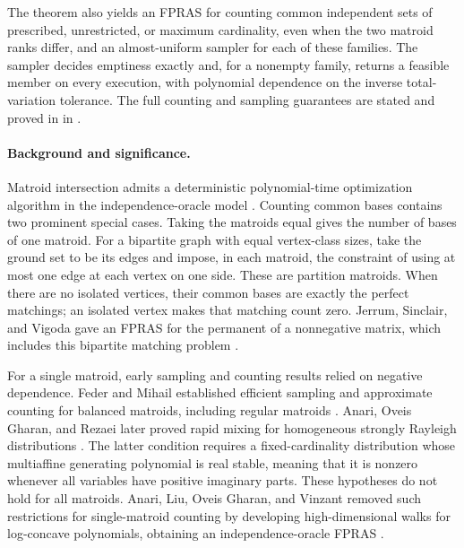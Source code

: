 \documentclass[11pt]{article}
\theoremstyle{definition}
\begin{document}
The theorem also yields an FPRAS for counting common independent sets
of prescribed, unrestricted, or maximum cardinality, even when the two
matroid ranks differ, and an almost-uniform sampler for each of these
families.  The sampler decides emptiness exactly and, for a nonempty
family, returns a feasible member on every execution, with polynomial
dependence on the inverse total-variation tolerance.  The full counting
and sampling guarantees are stated and proved in
 in .

\paragraph{Background and significance.}
Matroid intersection admits a deterministic polynomial-time optimization
algorithm in the independence-oracle model \cite{Edmonds1979,Schrijver2003}.
Counting common bases contains two prominent special cases.  Taking
the matroids equal gives the number of bases of one matroid.  For a
bipartite graph with equal vertex-class sizes, take the ground set to
be its edges and impose, in each matroid, the constraint of using at
most one edge at each vertex on one side.  These are partition
matroids.  When there are no isolated vertices, their common bases
are exactly the perfect matchings; an isolated vertex makes that
matching count zero.  Jerrum, Sinclair, and Vigoda gave an FPRAS for
the permanent of a nonnegative matrix, which includes this bipartite
matching problem \cite{JSV2004}.

For a single matroid, early sampling and counting results relied on
negative dependence.  Feder and Mihail established efficient sampling
and approximate counting for balanced matroids, including regular
matroids \cite{FM1992}.  Anari, Oveis Gharan, and Rezaei later proved
rapid mixing for homogeneous strongly Rayleigh distributions
\cite{AOR2016}.  The latter condition requires a fixed-cardinality
distribution whose multiaffine generating polynomial is real stable,
meaning that it is nonzero whenever all variables have positive
imaginary parts.  These hypotheses do not hold for all matroids.
Anari, Liu, Oveis Gharan, and Vinzant removed such restrictions for
single-matroid counting by developing high-dimensional walks for
log-concave polynomials, obtaining an independence-oracle FPRAS
\cite{ALOV2024}.
\end{document}
